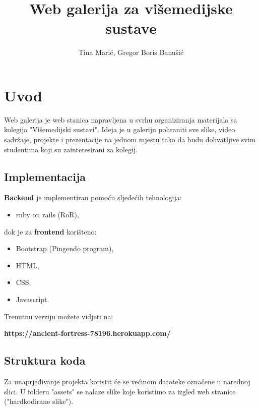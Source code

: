 \documentclass[]{article}
\title{Web galerija za višemedijske sustave}
\author{Tina Marić, Gregor Boris Banušić}
\begin{document}
\maketitle


\section{Uvod}
Web galerija je web stanica napravljena u svrhu organiziranja materijala sa kolegija "Višemedijski sustavi".
Ideja je u galeriju pohraniti sve slike, video sadržaje, projekte i prezentacije na jednom mjestu tako da budu dohvatljive svim studentima koji su zainteresirani za kolegij.
\newline
\newline
\subsection{Implementacija}
\textbf{Backend} je implementiran pomoću sljedećih tehnologija:
\begin{itemize}
	\item ruby on rails (RoR),
\end{itemize}
dok je za \textbf{frontend} korišteno:
\begin{itemize}
	\item Bootstrap (Pingendo program),
	\item HTML,
	\item CSS,
	\item Javascript.
\end{itemize}

Trenutnu verziju možete vidjeti na:

\textbf{https://ancient-fortress-78196.herokuapp.com/}

\newpage

\subsection{Struktura koda}
Za unaprjeđivanje projekta koristit će se većinom datoteke označene u narednoj slici. U folderu "assets" se nalaze slike koje koristimo za izgled web stranice ("hardkodirane slike").
\end{document}
